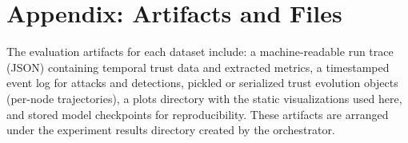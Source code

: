 \documentclass[12pt,a4paper]{article}
\begin{document}
\section{Appendix: Artifacts and Files}
The evaluation artifacts for each dataset include: a machine-readable run trace (JSON) containing temporal trust data and extracted metrics, a timestamped event log for attacks and detections, pickled or serialized trust evolution objects (per-node trajectories), a plots directory with the static visualizations used here, and stored model checkpoints for reproducibility. These artifacts are arranged under the experiment results directory created by the orchestrator.
\end{document}
